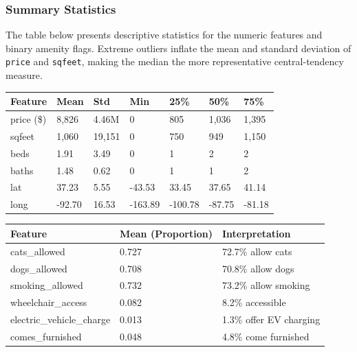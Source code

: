 \subsubsection{Summary Statistics}
\noindent
The table below presents descriptive statistics for the numeric features and binary amenity flags. Extreme outliers inflate the mean and standard deviation of \texttt{price} and \texttt{sqfeet}, making the median the more representative central-tendency measure.

\begin{table}[H]
    \centering
    \begin{tabular}{||p{2.8cm}|p{1.8cm}|p{1.8cm}|p{1.8cm}|p{1.7cm}|p{1.7cm}|p{1.7cm}||}
    \hline
    \hline
        Feature & Mean & Std & Min & 25\% & 50\% & 75\% \\
        \hline
        \hline
        price (\$) & 8,826 & 4.46M & 0 & 805 & 1,036 & 1,395 \\
        \hline
        sqfeet & 1,060 & 19,151 & 0 & 750 & 949 & 1,150 \\
        \hline
        beds & 1.91 & 3.49 & 0 & 1 & 2 & 2 \\
        \hline
        baths & 1.48 & 0.62 & 0 & 1 & 1 & 2 \\
        \hline
        lat & 37.23 & 5.55 & -43.53 & 33.45 & 37.65 & 41.14 \\
        \hline
        long & -92.70 & 16.53 & -163.89 & -100.78 & -87.75 & -81.18 \\
        \hline
        \hline
    \end{tabular}
\end{table}

\vspace{-9pt}

\begin{table}[H]
    \centering
    \begin{tabular}{||p{4.3cm}|p{3cm}|p{3cm}||}
    \hline
    \hline
        Feature & Mean (Proportion) & Interpretation \\
        \hline
        \hline
        cats\_allowed & 0.727 & 72.7\% allow cats \\
        \hline
        dogs\_allowed & 0.708 & 70.8\% allow dogs \\
        \hline
        smoking\_allowed & 0.732 & 73.2\% allow smoking \\
        \hline
        wheelchair\_access & 0.082 & 8.2\% accessible \\
        \hline
        electric\_vehicle\_charge & 0.013 & 1.3\% offer EV charging \\
        \hline
        comes\_furnished & 0.048 & 4.8\% come furnished \\
        \hline
        \hline
    \end{tabular}
\end{table}

